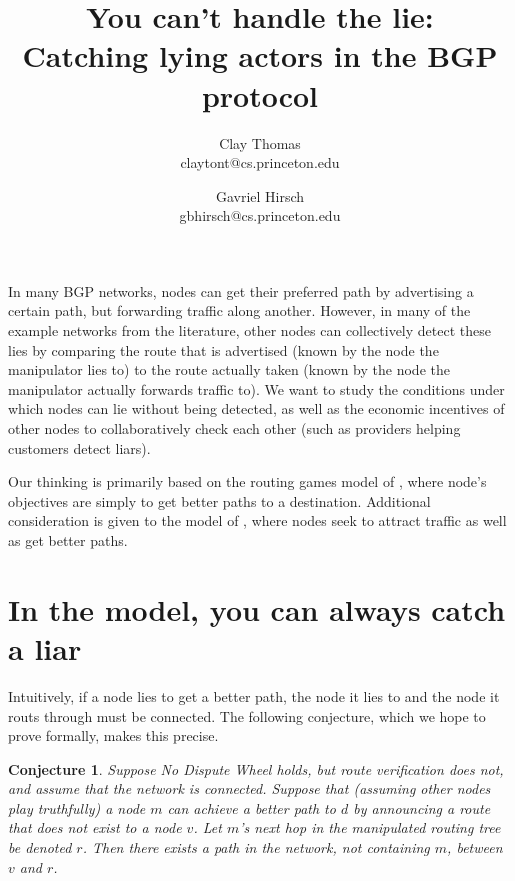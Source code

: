 \documentclass[12pt]{article}
\newtheorem{conjecture}{Conjecture}
\begin{document}

\title{
  You can't handle the lie: \\
  Catching lying actors in the BGP protocol 
}
\author{
  Clay Thomas\\ claytont@cs.princeton.edu
  \and 
  Gavriel Hirsch\\ gbhirsch@cs.princeton.edu 
}
\maketitle

In many BGP networks, nodes can get their preferred path
by advertising a certain path, but forwarding traffic along another.
However, in many of the example networks from the literature,
other nodes can collectively detect these lies
by comparing the route that is advertised (known by the node
the manipulator lies to)
to the route actually taken
(known by the node the manipulator actually forwards traffic to).
We want to study the conditions under which nodes
can lie without being detected,
as well as the economic incentives of other nodes to collaboratively
check each other (such as providers helping customers detect liars).

Our thinking is primarily based on the routing games model of
\cite{RoutingGames}, where node's objectives are simply to get
better paths to a destination.
Additional consideration is given to the model
of \cite{Attraction}, where nodes seek to attract traffic as
well as get better paths.

\section{In the \cite{RoutingGames} model, you can always catch a liar}

  Intuitively, if a node lies to get a better path, the node it lies
  to and the node it routs through must be connected.
  The following conjecture, which we hope to prove formally,
  makes this precise.
  \begin{conjecture}
    Suppose No Dispute Wheel holds, but route verification does not, and
    assume that the network is connected.
    Suppose that (assuming other nodes play truthfully)
    a node $m$ can achieve a better path to $d$ by announcing
    a route that does not exist to a node $v$.
    Let $m$'s next hop in the manipulated routing tree be denoted $r$.
    Then there exists a path in the network, not containing $m$,
    between $v$ and $r$.
  \end{conjecture}
\end{document}
